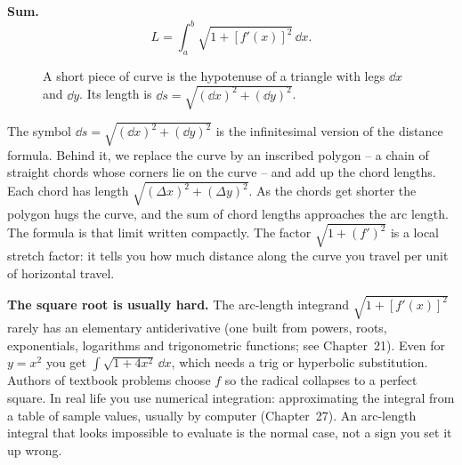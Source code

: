 \textbf{Sum.}
\[
  \boxed{\,L = \int_a^b \sqrt{1 + [f'(x)]^2}\,\dd x.\,}
\]

\begin{figure}[H]
\centering
{}
\caption{A short piece of curve is the hypotenuse of a triangle with legs $\dd x$
and $\dd y$. Its length is $\dd s = \sqrt{(\dd x)^2+(\dd y)^2}$.}
\label{ch26:fig-arclength}
\end{figure}

\begin{happeningbox}
The symbol $\dd s = \sqrt{(\dd x)^2 + (\dd y)^2}$ is the infinitesimal version of
the distance formula. Behind it, we replace the curve by an
inscribed polygon -- a chain of straight chords whose corners lie on the curve --
and add up the chord lengths.
Each chord has length $\sqrt{(\Delta x)^2 + (\Delta y)^2}$. As the chords get
shorter the polygon hugs the curve, and the sum of chord lengths approaches the
arc length. The formula is that limit written compactly. The factor
$\sqrt{1+(f')^2}$ is a local stretch factor: it tells you how much distance along
the curve you travel per unit of horizontal travel.
\end{happeningbox}

\begin{trapbox}
\textbf{The square root is usually hard.} The arc-length integrand
$\sqrt{1+[f'(x)]^2}$ rarely has an elementary antiderivative (one built from
powers, roots, exponentials, logarithms and trigonometric functions; see Chapter~21).
Even for $y=x^2$ you get $\int\sqrt{1+4x^2}\,\dd x$, which needs a trig or
hyperbolic substitution. Authors of textbook problems choose $f$ so the radical
collapses to a perfect square. In real life you use numerical integration:
approximating the integral from a table of sample values, usually by computer
(Chapter~27). An arc-length integral that looks impossible to evaluate is the
normal case, not a sign you set it up wrong.
\end{trapbox}

